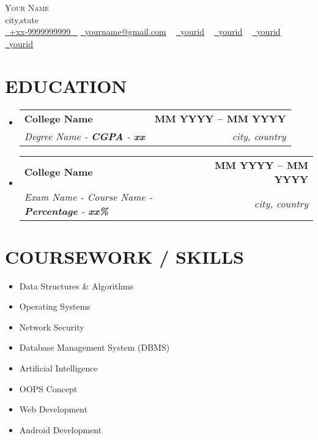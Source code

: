 \documentclass[letterpaper,11pt]{article}
\makeatletter
\newcommand{\resumeSubheading}[4]{
  \vspace{-2pt}\item
    \begin{tabular*}{1.0\textwidth}[t]{l@{\extracolsep{\fill}}r}
      \textbf{\large#1} & \textbf{\small #2} \\
      \textit{\large#3} & \textit{\small #4} \\
      
    \end{tabular*}\vspace{-7pt}
}
\newcommand{\resumeSubHeadingListStart}{\begin{itemize}[leftmargin=0.0in, label={}]}
\newcommand{\resumeSubHeadingListEnd}{\end{itemize}}
\makeatother
\begin{document}


\begin{center}
    {\Huge \scshape Your Name} \\ \vspace{1pt}
    city,state \\ \vspace{1pt}
    \small \href{tel:+xxxxxxxxxxxx}{ \raisebox{-0.1\height}\faPhone\ \underline{+xx-9999999999} ~} \href{mailto:yourname@gmail.com}{\raisebox{-0.2\height}\faEnvelope\  \underline{yourname@gmail.com}} ~ 
    \href{https://linkedin.com/in/yourid}{\raisebox{-0.2\height}\faLinkedinSquare\ \underline{yourid}}  ~
    \href{https://github.com/yourid}{\raisebox{-0.2\height}\faGithub\ \underline{yourid}} ~
    \href{https://www.hackerrank.com/yourid}{\raisebox{-0.2\height}\faHackerrank\ \underline{yourid}} ~
    \href{https://codeforces.com/profile/yourid}{\raisebox{-0.2\height}\faPoll\ \underline{yourid}}
    \vspace{-8pt}
\end{center}


\section{EDUCATION}
  \resumeSubHeadingListStart
    \resumeSubheading
      {College Name}{MM YYYY -- MM YYYY}
      {Degree Name - \textbf{CGPA} - \textbf{xx}}{city, country}
  \resumeSubHeadingListEnd
  
  \resumeSubHeadingListStart
    \resumeSubheading
      {College Name}{MM YYYY -- MM YYYY}
      {Exam Name - Course Name  - \textbf{Percentage} - \textbf{xx\%}}{city, country}
  \resumeSubHeadingListEnd

\section{COURSEWORK / SKILLS}
        \begin{multicols}{4}
            \begin{itemize}[itemsep=-2pt, parsep=5pt]
                \item Data Structures \& Algorithms
                \item Operating Systems
                \item Network Security
                \item Database Management System (DBMS)
                \item Artificial Intelligence
                \item OOPS Concept
                \item Web Development
                \item Android Development
            \end{itemize}
        \end{multicols}
        \vspace*{2.0\multicolsep}
\end{document}

